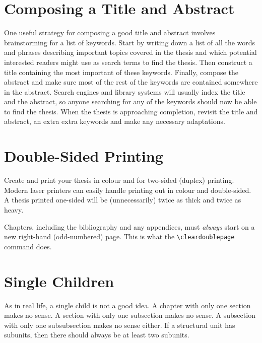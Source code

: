 \section{Composing a Title and Abstract}

One useful strategy for composing a good title and abstract involves
brainstorming for a list of keywords. Start by writing down a list of
all the words and phrases describing important topics covered in the
thesis and which potential interested readers might use as search
terms to find the thesis. Then construct a title containing the most
important of these keywords. Finally, compose the abstract and make
sure most of the rest of the keywords are contained somewhere in the
abstract. Search engines and library systems will usually index the
title and the abstract, so anyone searching for any of the keywords
should now be able to find the thesis. When the thesis is approaching
completion, revisit the title and abstract, an extra extra keywords
and make any necessary adaptations.




\section{Double-Sided Printing}

Create and print your thesis in colour and for two-sided (duplex)
printing. Modern laser printers can easily handle printing out in
colour and double-sided. A thesis printed one-sided will be
(unnecessarily) twice as thick and twice as heavy.

Chapters, including the bibliography and any appendices, must
\emph{always} start on a new right-hand (odd-numbered) page.  This is
what the \lstinline!\cleardoublepage! command does.






\section{Single Children}

As in real life, a single child is not a good idea. A chapter with
only one section makes no sense. A section with only one subsection
makes no sense. A subsection with only one subsubsection makes no
sense either. If a structural unit has subunits, then there should
always be at least two subunits.







